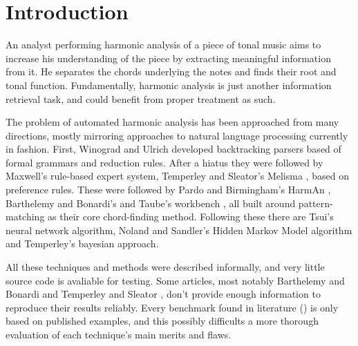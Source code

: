 \documentclass{article}
\title{}
\begin{document}
\graphicspath{{figs/}{data/}}
\maketitle

\begin{abstract}
\end{abstract}

\section{Introduction}
\label{sec:introduction}


An analyst performing harmonic analysis of a piece of tonal music aims
to increase his understanding of the piece by extracting meaningful
information from it.  He separates the chords underlying the notes and
finds their root and tonal function.  Fundamentally, harmonic analysis
is just another information retrieval task, and could benefit from
proper treatment as such.

The problem of automated harmonic analysis has been approached from
many directions, mostly mirroring approaches to natural language
processing currently in fashion.  First, Winograd
\cite{winograd:linguistics} and Ulrich \cite{ulrich:analysis}
developed backtracking parsers based of formal grammars and reduction
rules.  After a hiatus they were followed by Maxwell's
\cite{maxwell:expert} rule-based expert system, Temperley and
Sleator's Melisma \cite{temperley.ea:modeling}, based on preference
rules.  These were followed by Pardo and Birmingham's HarmAn
\cite{pardo.ea:automated}, Barthelemy and Bonardi's
\cite{barthelemy.ea:figured} and Taube's workbench
\cite{taube:automatic}, all built around pattern-matching as their
core chord-finding method.  Following these there are Tsui's
\cite{tsui:harmonic} neural network algorithm, Noland and Sandler's
\cite{noland.ea:key} Hidden Markov Model algorithm and Temperley's
\cite{temperley:bayesian} bayesian approach.

All these techniques and methods were described informally, and very
little source code is avaliable for testing.  Some articles, most
notably Barthelemy and Bonardi \cite{barthelemy.ea:figured} and
Temperley and Sleator \cite{temperley.ea:modeling}, don't
provide enough information to reproduce their results reliably.  Every
benchmark found in literature (\cite{pardo.ea:automated,
  barthelemy.ea:figured, tsui:harmonic, taube:automatic,
  illescas.ea:harmonic}) is only based on published examples, and this
possibly difficults a more thorough evaluation of each technique's
main merits and flaws.
\end{document}
